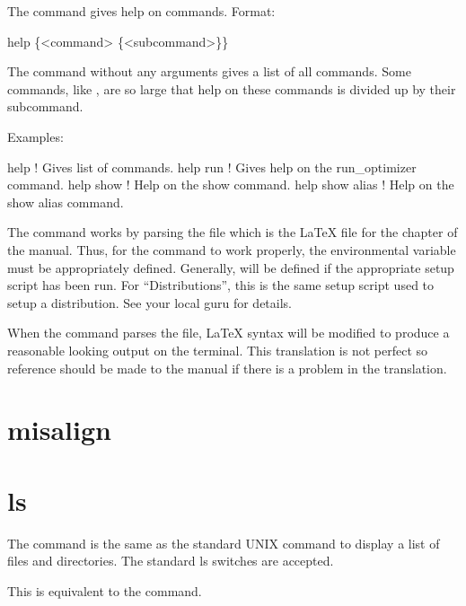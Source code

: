 The  command gives help on \tao commands. Format:
\begin{example}
  help \{<command> \{<subcommand>\}\}
\end{example}

\vskip 10pt

The  command without any arguments gives a list of all commands.  Some commands, like
, are so large that help on these commands is divided up by their subcommand.

Examples:
\begin{example}
  help            ! Gives list of commands.
  help run        ! Gives help on the run_optimizer command.
  help show       ! Help on the show command.
  help show alias ! Help on the show alias command.
\end{example}

The  command works by parsing the file  which is
the LaTeX file for the  chapter of the \tao manual. Thus, for the  command
to work properly, the environmental variable  must be appropriately defined. Generally,
 will be defined if the appropriate setup script has been run. For ``Distributions'',
this is the same setup script used to setup a distribution. See your local \bmad guru for details.

When the  command parses the  file, LaTeX syntax will
be modified to produce a reasonable looking output on the terminal. This translation is not perfect so
reference should be made to the \tao manual if there is a problem in the translation.

\section{misalign}
\label{s:misalign}

\section{ls}
\label{s:ls}

The  command is the same as the standard UNIX  command to display a list of files and
directories. The standard ls switches are accepted.

This is equivalent to the  command.

